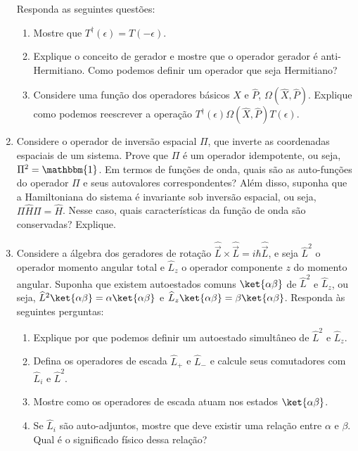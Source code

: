 \begin{enumerate}
\begin{itemize}
	      \end{itemize}
	      Responda as seguintes questões:
	      \begin{enumerate}
		      \item Mostre que $T^\dagger(\epsilon) = T(-\epsilon)$.
		      \item Explique o conceito de gerador e mostre que o operador gerador é
		            anti-Hermitiano. Como podemos definir um operador que seja Hermitiano?
		      \item Considere uma função dos operadores básicos $\widehat{X}$ e
		            $\widehat{P}$, $\Omega(\widehat{X}, \widehat{P})$. Explique como podemos
		            reescrever a operação $T^\dagger(\epsilon)\Omega(\widehat{X},
			            \widehat{P})T(\epsilon)$.
	      \end{enumerate}
	\item Considere o operador de inversão espacial $\Pi$, que inverte as coordenadas
	      espaciais de um sistema. Prove que $\Pi$ é um operador idempotente, ou seja,
	      $\Pi^2 = \mathbbm{1}$. Em termos de funções de onda, quais são as auto-funções
	      do operador $\Pi$ e seus autovalores correspondentes? Além disso, suponha que
	      a Hamiltoniana do sistema é invariante sob inversão espacial, ou seja, $\Pi
		      \widehat{H} \Pi = \widehat{H}$. Nesse caso, quais características da função de
	      onda são conservadas? Explique.
	\item Considere a álgebra dos geradores de rotação $\widehat{\vec{L}} \times
		      \widehat{\vec{L}} = i\hbar\widehat{\vec{L}}$, e seja $\widehat{L}^2$ o operador
	      momento angular total e $\widehat{L}_z$ o operador componente $z$ do momento
	      angular. Suponha que existem autoestados comuns $\ket{\alpha\beta}$ de
	      $\widehat{L}^2$ e $\widehat{L}_z$, ou seja, $\widehat{L}^2\ket{\alpha\beta} =
		      \alpha\ket{\alpha\beta}$ e $\widehat{L}_z\ket{\alpha\beta} =
		      \beta\ket{\alpha\beta}$. Responda às seguintes perguntas:
	      \begin{enumerate}
		      \item Explique por que podemos definir um autoestado simultâneo de
		            $\widehat{L}^2$ e $\widehat{L}_z$.
		      \item Defina os operadores de escada $\widehat{L}_+$ e $\widehat{L}_-$ e
		            calcule seus comutadores com $\widehat{L}_i$ e $\widehat{L}^2$.
		      \item Mostre como os operadores de escada atuam nos estados $\ket{\alpha\beta}$.
		      \item Se $\widehat{L}_i$ são auto-adjuntos, mostre que deve existir uma
		            relação entre $\alpha$ e $\beta$. Qual é o significado físico dessa
		            relação?
	      \end{enumerate}
\end{enumerate}


